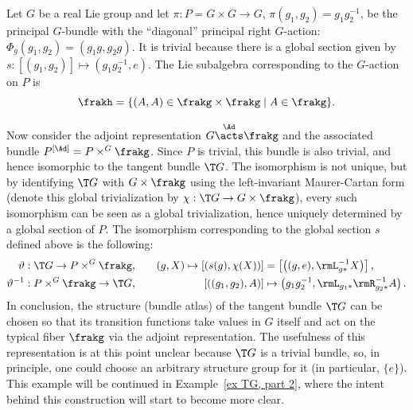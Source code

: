 \begin{example}\label{ex TG, part 1}
    Let $G$ be a real Lie group and let $\pi:P=G\times G\to G$, $\pi(g_1,g_2)=g_1g_2^{-1}$, be the principal $G$-bundle with the ``diagonal'' principal right $G$-action: $\Phi_g(g_1,g_2)=(g_1g,g_2g)$.  It is trivial because there is a global section given by $s:[(g_1,g_2)]\mapsto (g_1g_2^{-1},e)$. The Lie subalgebra corresponding to the $G$-action on $P$ is 
    \[\frakh=\{(A,A)\in \frakg\times\frakg\mid A\in\frakg\}.\]

    Now consider the adjoint representation $G\overset{\Ad}{\acts}\frakg$ and the associated bundle $P^{[\Ad]}=P\times^G \frakg$. Since $P$ is trivial, this bundle is also trivial, and hence isomorphic to the tangent bundle $\T G$. The isomorphism is not unique, but by identifying $\T G$ with $G\times\frakg$ using the left-invariant Maurer-Cartan form (denote this global trivialization by $\chi:\T G\to G\times \frakg$), every such isomorphism can be seen as a global trivialization, hence uniquely determined by a global section of $P$. The isomorphism corresponding to the global section $s$ defined above is the following:
    \begin{align}
    	\vartheta&: \T G\to P \times^G \frakg,&\quad (g,X)\mapsto \left[\left(s(g),\chi(X)\right)\right]&=\left[\left((g,e),\rmL_{g\ast}^{-1}X\right)\right],\\
    	\vartheta^{-1}&: P\times^G \frakg\to \T G,&\quad \left[\left((g_1,g_2),A\right)\right]&\mapsto \left(g_1g_2^{-1},\rmL_{g_1\ast}\rmR_{g_2\ast}^{-1}  A\right).
    \end{align}
    In conclusion, the structure (bundle atlas) of the tangent bundle $\T G$ can be chosen so that its transition functions take values in $G$ itself and act on the typical fiber $\frakg$ via the adjoint representation. The usefulness of this representation is at this point unclear because $\T G$ is a trivial bundle, so, in principle, one could choose an arbitrary structure group for it (in particular, $\{e\}$). This example will be continued in Example~\ref{ex TG, part 2}, where the intent behind this construction will start to become more clear.
\end{example}


